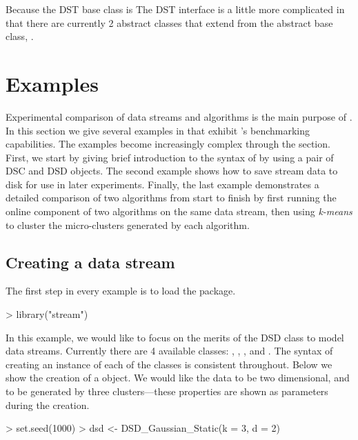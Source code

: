 \documentclass[nojss]{jss}
\begin{document}
Because the DST base class is The DST interface is a little more complicated in that there are currently 2 abstract classes that extend from the abstract base class, .

\section{Examples}
\label{sec:examples}

Experimental comparison of data streams and algorithms is the main purpose of . In this section we give several examples in  that exhibit 's benchmarking capabilities. The examples become increasingly complex through the section. First, we start by giving brief introduction to the syntax of  by using a pair of DSC and DSD objects. The second example shows how to save stream data to disk for use in later experiments. Finally, the last example demonstrates a detailed comparison of two algorithms from start to finish by first running the online component of two algorithms on the same data stream, then using \textit{k-means} to cluster the micro-clusters generated by each algorithm.

\subsection{Creating a data stream}
\label{examples:ds}

The first step in every example is to load the package.

\begin{Schunk}
\begin{Sinput}
> library("stream")
\end{Sinput}
\end{Schunk}

In this example, we would like to focus on the merits of the DSD class to model data streams. Currently there are 4 available classes: , , , and . The syntax of creating an instance of each of the classes is consistent throughout. Below we show the creation of a  object. We would like the data to be two dimensional, and to be generated by three clusters---these properties are shown as parameters during the creation. 

\begin{Schunk}
\begin{Sinput}
> set.seed(1000)
> dsd <- DSD_Gaussian_Static(k = 3, d = 2)
\end{Sinput}
\end{Schunk}
\end{document}

